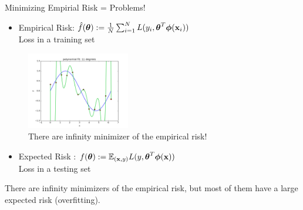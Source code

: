 \documentclass[xcolor=pdftex,dvipsnames,table,mathserif]{beamer}
\begin{document}
\begin{frame}{Minimizing Empirial Risk = Problems!}
\begin{itemize}
\item Empirical Risk: $\hat{f}(\boldsymbol{\theta}) :=\frac{1}{N} \sum_{i=1}^{N} L(y_i,\boldsymbol{\theta}^T\boldsymbol{\phi} (\mathbf{x}_i))$ \pause \\\alert{Loss in a training set}
\end{itemize}
\begin{figure}[htb]
\includegraphics[width=0.4\textwidth]{../graphics/polyfit_degree_11.png}
\caption{There are infinity minimizer of the empirical risk!}
\end{figure}
 \pause
\begin{itemize}
\item Expected Risk : $f(\boldsymbol{\theta}) := \mathbb{E}_{(\mathbf{x},y)} L(y,\boldsymbol{\theta}^T\boldsymbol{\phi} (\mathbf{x}))$ \pause  \\\alert{Loss in a testing set}
\end{itemize}
There are infinity minimizers of the empirical risk, but most of them have a large expected risk (\alert{overfitting}).
\end{frame}
\end{document}
